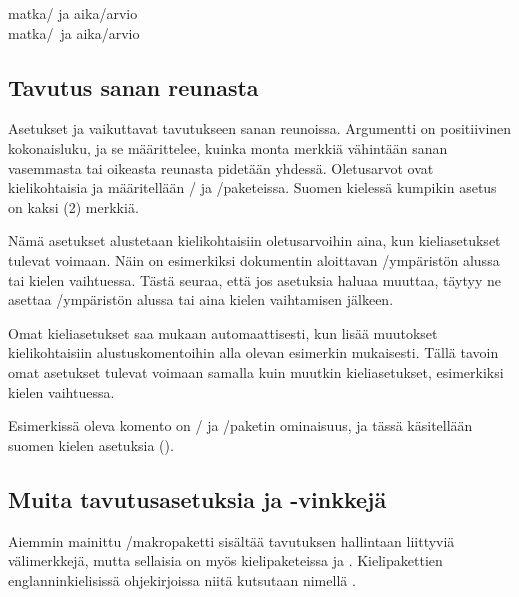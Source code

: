\begin{tulossis}
  matka\-/{} ja aika\-/arvio \\
  matka\-/\ ja aika\-/arvio
\end{tulossis}

\subsection{Tavutus sanan reunasta}

Asetukset  ja  vaikuttavat tavutukseen sanan reunoissa.
Argumentti  on positiivinen kokonaisluku, ja se määrittelee,
kuinka monta merkkiä vähintään sanan vasemmasta tai oikeasta reunasta
pidetään yhdessä. Oletus\-arvot ovat kielikohtaisia ja määritellään
\-/{} ja \-/paketeissa. Suomen
kielessä kumpikin asetus on kaksi (2) merkkiä.

Nämä asetukset alustetaan kielikohtaisiin oletus\-arvoihin aina, kun
kieliasetukset tulevat voimaan. Näin on esimerkiksi dokumentin
aloittavan \-/ympäristön alussa tai kielen vaihtuessa.
Tästä seuraa, että jos asetuksia ha\-luaa muuttaa, täytyy ne asettaa
\-/ympäristön alussa tai aina kielen vaihtamisen
jälkeen.

Omat kieli\-asetukset saa mukaan automaattisesti, kun lisää muutokset
kielikohtaisiin alustuskomentoihin alla olevan esimerkin mukaisesti.
Tällä tavoin omat asetukset tulevat voimaan samalla kuin muutkin
kieliasetukset, esimerkiksi kielen vaihtuessa.

\begin{koodilohkosis}
\end{koodilohkosis}

Esimerkissä oleva komento  on
\-/{} ja \-/paketin ominaisuus, ja
tässä käsitellään suomen kielen asetuksia ().

\subsection{Muita tavutusasetuksia ja -vinkkejä}
\label{luku:tavutus_muut}

Aiemmin mainittu \-/makropaketti sisältää tavutuksen
hallintaan liittyviä välimerkkejä, mutta sellaisia on myös
kielipaketeissa  ja . Kielipakettien
englanninkielisissä ohjekirjoissa niitä kutsutaan nimellä
\emph{}.

